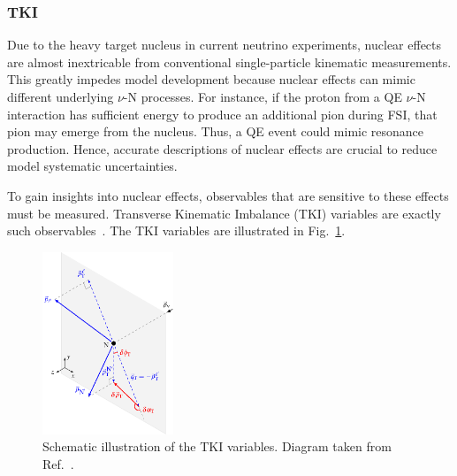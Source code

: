 \subsubsection{TKI}
\label{sec:nuint-tki}
Due to the heavy target nucleus in current neutrino experiments, nuclear effects are almost inextricable from conventional single-particle kinematic measurements.
This greatly impedes model development because nuclear effects can mimic different underlying $\nu$-N processes.
For instance, if the proton from a QE $\nu$-N interaction has sufficient energy to produce an additional pion during FSI, that pion may emerge from the nucleus.
Thus, a QE event could mimic resonance production.
Hence, accurate descriptions of nuclear effects are crucial to reduce model systematic uncertainties.

To gain insights into nuclear effects, observables that are sensitive to these effects must be measured.
Transverse Kinematic Imbalance (TKI) variables are exactly such observables~\cite{Lu:2015hea, Lu:2015tcr}.
The TKI variables are illustrated in Fig.~\ref{fig:stki}.

\begin{figure}[!htb] 	
    \centering 		
    \includegraphics[width=0.35\textwidth]{figures/stki.eps}
    \caption{\label{fig:stki} Schematic illustration of the TKI variables. Diagram taken from Ref.~\cite{Lu:2015tcr}.} 
\end{figure}

